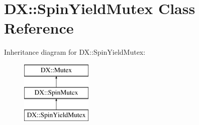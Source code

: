 \hypertarget{class_d_x_1_1_spin_yield_mutex}{\section{D\-X\-:\-:Spin\-Yield\-Mutex Class Reference}
\label{class_d_x_1_1_spin_yield_mutex}
}
Inheritance diagram for D\-X\-:\-:Spin\-Yield\-Mutex\-:\begin{figure}[H]
\begin{center}
\leavevmode
\includegraphics[height=3.000000cm]{class_d_x_1_1_spin_yield_mutex}
\end{center}
\end{figure}

